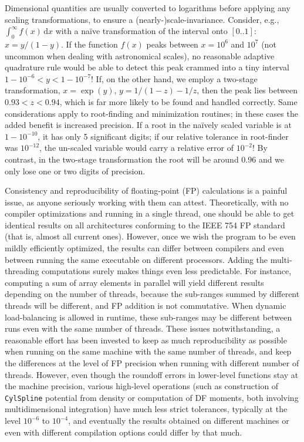 \documentclass[12pt]{article}
\renewcommand{\d}{\mathrm{d}}
\begin{document}
Dimensional quantities are usually converted to logarithms before applying any scaling transformations, to ensure a (nearly-)scale-invariance. Consider, e.g., $\int_0^\infty f(x)\,\d x$ with a na\"ive transformation of the interval onto $[0..1]$: $x = y/(1-y)$. If the function $f(x)$ peaks between $x=10^6$ and $10^7$ (not uncommon when dealing with astronomical scales), no reasonable adaptive quadrature rule would be able to detect this peak crammed into a tiny interval $1-10^{-6} < y < 1-10^{-7}$! If, on the other hand, we employ a two-stage transformation, $x = \exp(y)$, $y = 1/(1-z)-1/z$, then the peak lies between $0.93<z<0.94$, which is far more likely to be found and handled correctly. Same considerations apply to root-finding and minimization routines; in these cases the added benefit is increased precision. If a root in the na\"ively scaled variable is at $1-10^{-10}$, it has only 5 significant digits; if our relative tolerance in root-finder was $10^{-12}$, the un-scaled variable would carry a relative error of $10^{-2}$! By contrast, in the two-stage transformation the root will be around 0.96 and we only lose one or two digits of precision.

Consistency and reproducibility of floating-point (FP) calculations is a painful issue, as anyone seriously working with them can attest. Theoretically, with no compiler optimizations and running in a single thread, one should be able to get identical results on all architectures conforming to the IEEE 754 FP standard (that is, almost all current ones). However, once we wish the program to be even mildly efficiently optimized, the results can differ between compilers and even between running the same executable on different processors. Adding the multi-threading computations surely makes things even less predictable. For instance, computing a sum of array elements in parallel will yield different results depending on the number of threads, because the sub-ranges summed by different threads will be different, and FP addition is not commutative. When dynamic load-balancing is allowed in runtime, these sub-ranges may be different between runs even with the same number of threads. These issues notwithstanding, a reasonable effort has been invested to keep as much reproducibility as possible when running on the same machine with the same number of threads, and keep the differences at the level of FP precision when running with different number of threads. However, even though the roundoff errors in lower-level functions stay at the machine precision, various high-level operations (such as construction of \texttt{CylSpline} potential from density or computation of DF moments, both involving multidimensional integration) have much less strict tolerances, typically at the level $10^{-6}$ to $10^{-4}$, and eventually the results obtained on different machines or even with different compilation options could differ by that much.
\end{document}
